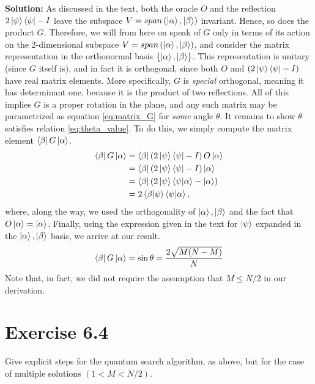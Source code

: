 \documentclass{book}
\begin{document}
    \textbf{Solution:} As discussed in the text, both the oracle $O$ and the reflection $2\ket{\psi}\bra{\psi}-I$ leave the subspace $V = span\left(\ket{\alpha},\ket{\beta}\right)$ invariant. Hence, so does the product $G$. Therefore, we will from here on speak of $G$ only in terms of its action on the 2-dimensional subspace $V = span\left(\ket{\alpha},\ket{\beta}\right)$, and consider the matrix representation in the orthonormal basis $\{\ket{\alpha},\ket{\beta}\}$. This representation is unitary (since $G$ itself is), and in fact it is orthogonal, since both $O$ and $(2\ket{\psi}\bra{\psi}-I)$ have real matrix elements. More specifically, $G$ is \emph{special} orthogonal, meaning it has determinant one, because it is the product of two reflections. All of this implies $G$ is a proper rotation in the plane, and any such matrix may be parametrized as equation \eqref{eq:matrix_G} for \emph{some} angle $\theta$. It remains to show $\theta$ satisfies relation \eqref{eq:theta_value}. To do this, we simply compute the matrix element $\bra{\beta}G\ket{\alpha}$.
    \begin{align}
    \begin{aligned}
        \bra{\beta}G\ket{\alpha} &= \bra{\beta}\left(2\ket{\psi}\bra{\psi}-I\right)O\ket{\alpha} \\
        &=\bra{\beta}\left(2\ket{\psi}\bra{\psi}-I\right)\ket{\alpha}\\
        &=\bra{\beta}\left(2\ket{\psi}\braket{\psi}{\alpha}-\ket{\alpha}\right) \\
        &=2\braket{\beta}{\psi}\braket{\psi}{\alpha},
    \end{aligned}
    \end{align}
    where, along the way, we used the orthogonality of $\ket{\alpha},\ket{\beta}$ and the fact that $O\ket{\alpha} = \ket{\alpha}$. Finally, using the expression given in the text for $\ket{\psi}$ expanded in the $\ket{\alpha},\ket{\beta}$ basis, we arrive at our result. 
    \begin{align}
        \bra{\beta}G\ket{\alpha} = \sin\theta = \frac{2\sqrt{M(N-M)}}{N}
    \end{align}
    Note that, in fact, we did not require the assumption that $M\leq N/2$ in our derivation.

\section*{Exercise 6.4}
    Give explicit steps for the quantum search algorithm, as above, but for the case of multiple solutions $(1<M<N/2)$.
    
\end{document}

